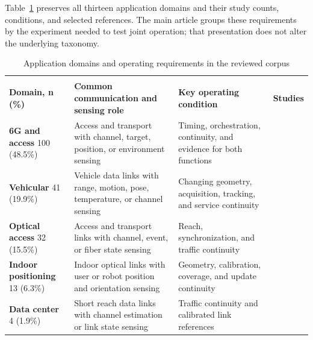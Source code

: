 Table~\ref{tab:s_application_census} preserves all thirteen application
domains and their study counts, conditions, and selected references.
The main article groups these requirements by the experiment needed to test
joint operation; that presentation does not alter the underlying taxonomy.
\begin{table}[!t]
\caption{Application domains and operating requirements in the reviewed corpus}
\label{tab:s_application_census}
\centering
\footnotesize
\setlength{\tabcolsep}{3pt}
\renewcommand{\arraystretch}{1.05}
\begin{tabularx}{\textwidth}{@{}
>{\raggedright\arraybackslash}p{}
>{\raggedright\arraybackslash}p{}
>{\raggedright\arraybackslash}X
>{\centering\arraybackslash}p{}@{}}
\toprule
\multicolumn{4}{@{}l}{\emph{Network and mobility}} \\
\addlinespace[1pt]
\textbf{Domain, n (\%)} & \textbf{Common communication and sensing role} &
\textbf{Key operating condition} & \textbf{Studies} \\
\midrule
\textbf{6G and access} 100 (48.5\%) & Access and transport with channel, target,
position, or environment sensing & Timing, orchestration, continuity, and
evidence for both functions & \cite{OISAC_SCR00277,OISAC_SCR01049} \\
\addlinespace[1.25pt]
\textbf{Vehicular} 41 (19.9\%) & Vehicle data links with range, motion, pose,
temperature, or channel sensing & Changing geometry, acquisition, tracking, and
service continuity & \cite{OISAC_SCR00123,OISAC_SCR00273} \\
\addlinespace[1.25pt]
\textbf{Optical access} 32 (15.5\%) & Access and transport links with channel,
event, or fiber state sensing & Reach, synchronization, and traffic continuity &
\cite{OISAC_SCR00007,OISAC_SCR01006,OISAC_SCR01049} \\
\addlinespace[1.25pt]
\textbf{Indoor positioning} 13 (6.3\%) & Indoor optical links with user or robot
position and orientation sensing & Geometry, calibration, coverage, and update
continuity &
\cite{OISAC_SCR00910,OISAC_SCR01024} \\
\addlinespace[1.25pt]
\textbf{Data center} 4 (1.9\%) & Short reach data links with channel estimation
or link state sensing & Traffic continuity and calibrated link references &
\cite{OISAC_SCR00007} \\
\bottomrule
\end{tabularx}


\end{table}
